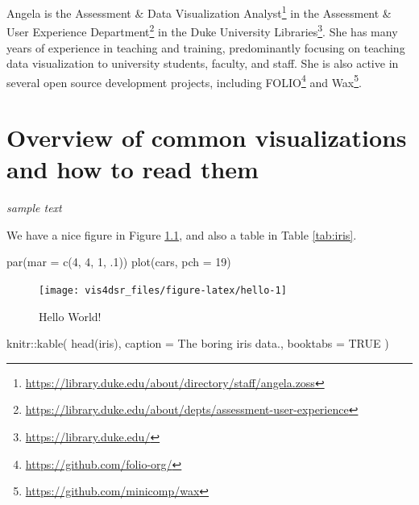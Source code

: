 \documentclass[
]{krantz}
\makeatletter
\newenvironment{Shaded}{\begin{snugshade}}{\end{snugshade}}
\newcommand{\AttributeTok}[1]{\textcolor[rgb]{0.61,0.61,0.61}{#1}}
\newcommand{\ConstantTok}[1]{\textcolor[rgb]{0,0,0}{#1}}
\newcommand{\DecValTok}[1]{\textcolor[rgb]{0.06,0.06,0.06}{#1}}
\newcommand{\FunctionTok}[1]{\textcolor[rgb]{0,0,0}{#1}}
\newcommand{\NormalTok}[1]{#1}
\newcommand{\SpecialCharTok}[1]{\textcolor[rgb]{0,0,0}{#1}}
\newcommand{\StringTok}[1]{\textcolor[rgb]{0.5,0.5,0.5}{#1}}
\renewcommand{\href}[2]{#2\footnote{\url{#1}}}
\newenvironment{kframe}{%
\medskip{}
\setlength{\fboxsep}{.8em}
 \def\at@end@of@kframe{}%
 \ifinner\ifhmode%
  \def\at@end@of@kframe{\end{minipage}}%
  \begin{minipage}{\columnwidth}%
 \fi\fi%
 \def\FrameCommand##1{\hskip\@totalleftmargin \hskip-\fboxsep
 \colorbox{shadecolor}{##1}\hskip-\fboxsep
     \hskip-\linewidth \hskip-\@totalleftmargin \hskip\columnwidth}%
 \MakeFramed {\advance\hsize-\width
   \@totalleftmargin\z@ \linewidth\hsize
   \@setminipage}}%
 {\par\unskip\endMakeFramed%
 \at@end@of@kframe}
\renewenvironment{Shaded}{\begin{kframe}}{\end{kframe}}
\makeatother
\begin{document}
Angela is the \href{https://library.duke.edu/about/directory/staff/angela.zoss}{Assessment \& Data Visualization Analyst} in the \href{https://library.duke.edu/about/depts/assessment-user-experience}{Assessment \& User Experience Department} in the \href{https://library.duke.edu/}{Duke University Libraries}. She has many years of experience in teaching and training, predominantly focusing on teaching data visualization to university students, faculty, and staff. She is also active in several open source development projects, including \href{https://github.com/folio-org/}{FOLIO} and \href{https://github.com/minicomp/wax}{Wax}.

\mainmatter

\hypertarget{reading-visualizations}{%
\chapter{Overview of common visualizations and how to read them}\label{reading-visualizations}}

\emph{sample text}

We have a nice figure in Figure \ref{fig:hello}, and also a table in Table \ref{tab:iris}.

\begin{Shaded}
\begin{Highlighting}[]
\FunctionTok{par}\NormalTok{(}\AttributeTok{mar =} \FunctionTok{c}\NormalTok{(}\DecValTok{4}\NormalTok{, }\DecValTok{4}\NormalTok{, }\DecValTok{1}\NormalTok{, .}\DecValTok{1}\NormalTok{))}
\FunctionTok{plot}\NormalTok{(cars, }\AttributeTok{pch =} \DecValTok{19}\NormalTok{)}
\end{Highlighting}
\end{Shaded}

\begin{figure}
\texttt{[image: vis4dsr\_files/figure-latex/hello-1]} \caption{Hello World!}\label{fig:hello}
\end{figure}

\begin{Shaded}
\begin{Highlighting}[]
\NormalTok{knitr}\SpecialCharTok{::}\FunctionTok{kable}\NormalTok{(}
  \FunctionTok{head}\NormalTok{(iris), }\AttributeTok{caption =} \StringTok{\textquotesingle{}The boring iris data.\textquotesingle{}}\NormalTok{,}
  \AttributeTok{booktabs =} \ConstantTok{TRUE}
\NormalTok{)}
\end{Highlighting}
\end{Shaded}
\end{document}
